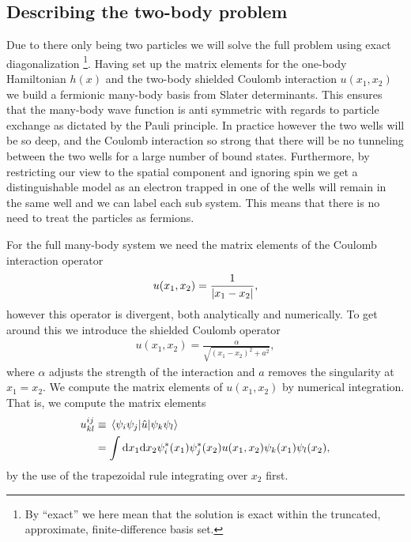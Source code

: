 \documentclass[twocolumn,superscriptaddress,unsortedaddress,
 amsmath,amssymb,
 aps,
]{revtex4-2}
\begin{document}
    \subsection{Describing the two-body problem}
        Due to there only being two particles we will solve the full problem
        using exact diagonalization \footnote{
            By ``exact'' we here mean that the solution is exact within the
            truncated, approximate, finite-difference basis set.
        }.
        Having set up the matrix elements for the one-body Hamiltonian $h(x)$ and the
        two-body shielded Coulomb interaction $u(x_1, x_2)$ we build a fermionic
        many-body basis from Slater determinants.
        This ensures that the many-body wave function is anti symmetric with regards to
        particle exchange as dictated by the Pauli principle.
        In practice however the two wells will be so deep, and the Coulomb interaction
        so strong that there will be no tunneling between the two wells for a large
        number of bound states.
        Furthermore, by restricting our view to the spatial component and ignoring spin
        we get a distinguishable model as an electron trapped in one of the wells will
        remain in the same well and we can label each sub system.
        This means that there is no need to treat the particles as fermions.

        For the full many-body system we need the matrix elements of the Coulomb
        interaction operator
        \begin{align}
            u(x_1, x_2) = \frac{1}{\abs{x_1 - x_2}},
        \end{align}
        however this operator is divergent, both analytically and numerically.
        To get around this we introduce the shielded Coulomb operator \cite{su-coulomb}
        \begin{align}
            u(x_1, x_2) = \frac{\alpha}{\sqrt{(x_1 - x_2)^2 + a^2}},
        \end{align}
        where $\alpha$ adjusts the strength of the interaction and $a$ removes
        the singularity at $x_1 = x_2$.
        We compute the matrix elements of $u(x_1, x_2)$ by numerical integration.
        That is, we compute the matrix elements
        \begin{align}
            u^{ij}_{kl}
            &\equiv \mel{\psi_i\psi_j}{\hat{u}}{\psi_k\psi_l}
            \\
            &= \int\dd x_1 \dd x_2
            \psi_i^{*}(x_1)\psi_j^{*}(x_2)u(x_1, x_2)
            \psi_k(x_1)\psi_l(x_2),
        \end{align}
        by the use of the trapezoidal rule integrating over $x_2$ first.
 
\end{document}
